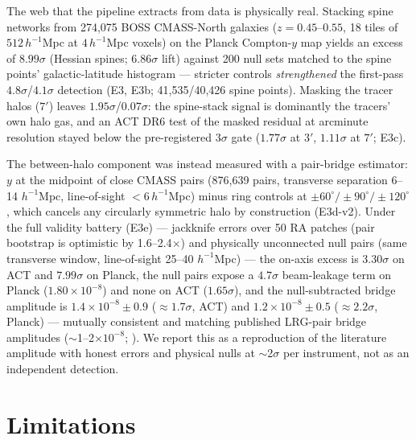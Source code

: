 \documentclass[11pt]{article}
\begin{document}
The web that the pipeline extracts from data is physically real. Stacking spine networks from 274,075 BOSS CMASS-North galaxies ($z = 0.45$--$0.55$, 18 tiles of $512\,h^{-1}$Mpc at $4\,h^{-1}$Mpc voxels) on the Planck Compton-$y$ map yields an excess of $8.99\sigma$ (Hessian spines; $6.86\sigma$ lift) against 200 null sets matched to the spine points' galactic-latitude histogram --- stricter controls \emph{strengthened} the first-pass $4.8\sigma$/$4.1\sigma$ detection (E3, E3b; 41,535/40,426 spine points). Masking the tracer halos ($7'$) leaves $1.95\sigma$/$0.07\sigma$: the spine-stack signal is dominantly the tracers' own halo gas, and an ACT DR6 test of the masked residual at arcminute resolution stayed below the pre-registered $3\sigma$ gate ($1.77\sigma$ at $3'$, $1.11\sigma$ at $7'$; E3c).

The between-halo component was instead measured with a pair-bridge estimator: $y$ at the midpoint of close CMASS pairs (876,639 pairs, transverse separation 6--14 $h^{-1}$Mpc, line-of-sight $< 6\,h^{-1}$Mpc) minus ring controls at $\pm 60^\circ/\pm 90^\circ/\pm 120^\circ$, which cancels any circularly symmetric halo by construction (E3d-v2). Under the full validity battery (E3e) --- jackknife errors over 50 RA patches (pair bootstrap is optimistic by 1.6--2.4$\times$) and physically unconnected null pairs (same transverse window, line-of-sight 25--40 $h^{-1}$Mpc) --- the on-axis excess is $3.30\sigma$ on ACT and $7.99\sigma$ on Planck, the null pairs expose a $4.7\sigma$ beam-leakage term on Planck ($1.80\times10^{-8}$) and none on ACT ($1.65\sigma$), and the null-subtracted bridge amplitude is $1.4\times10^{-8} \pm 0.9$ ($\approx 1.7\sigma$, ACT) and $1.2\times10^{-8} \pm 0.5$ ($\approx 2.2\sigma$, Planck) --- mutually consistent and matching published LRG-pair bridge amplitudes ($\sim$1--2$\times10^{-8}$; \cite{degraaff2019,tanimura2019}). We report this as a reproduction of the literature amplitude with honest errors and physical nulls at $\sim$2$\sigma$ per instrument, not as an independent detection.

\section{Limitations}
\label{sec:limitations}
\end{document}

